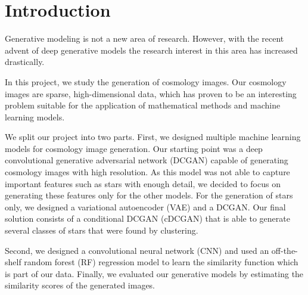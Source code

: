 \documentclass[10pt,conference,compsocconf]{IEEEtran}
\newcommand\TODO[1]{\textcolor{red}{#1}} %
\begin{document}
\section{Introduction}
\label{sec:introduction}
Generative modeling is not a new area of research. However, with the recent advent of deep generative models the research interest in this area has increased drastically. 

In this project, we study the generation of cosmology images. Our cosmology images are sparse, high-dimensional data, which has proven to be an interesting problem suitable for the application of mathematical methods and machine learning models.

We split our project into two parts. First, we designed multiple machine learning models for cosmology image generation. Our starting point was a deep convolutional generative adversarial network (DCGAN) capable of generating cosmology images with high resolution. As this model was not able to capture important features such as stars with enough detail, we decided to focus on generating these features only for the other models. 
For the generation of stars only, we designed a variational autoencoder (VAE) and a DCGAN. 
Our final solution consists of a conditional DCGAN (cDCGAN) that is able to generate several classes of stars that were found by clustering.

Second, we designed a convolutional neural network (CNN) and used an off-the-shelf random forest (RF) regression model to learn the similarity function which is part of our data. Finally, we evaluated our generative models by estimating the similarity scores of the generated images. 



\end{document}
